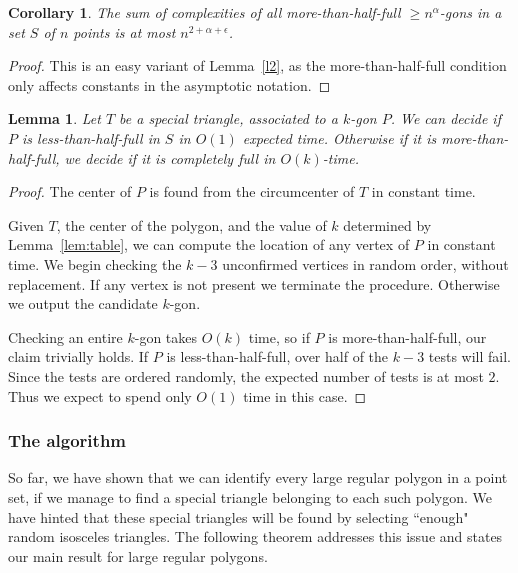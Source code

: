 \documentclass{article}
\newtheorem{lemma}{Lemma}
\newtheorem{cor}{Corollary}
\begin{document}
\begin{cor}
\label{c2}
The sum of complexities of all more-than-half-full ${\geq} n^{\alpha}$-gons
in a set $S$ of $n$ points is at most $n^{2{+}\alpha+\epsilon}$.
\end{cor}

\begin{proof}
This is an easy variant of Lemma~\ref{l2}, as the more-than-half-full
condition only affects constants in the asymptotic notation.
\end{proof}

\begin{lemma}
\label{l3}
Let $T$ be a special triangle, associated to a $k$-gon $P$.  We can decide if  $P$ is less-than-half-full in $S$ in $O(1)$ expected time.  Otherwise if it is more-than-half-full, we decide if it is completely full in $O(k)$-time.  
\end{lemma}
\begin{proof}
The center of $P$ is found from the circumcenter of $T$ in constant time.



Given $T$, the center of the polygon, and the value of $k$ determined by Lemma~\ref{lem:table},
we can compute 
the location of any vertex of $P$ in constant time.  We begin checking the $k{-}3$ unconfirmed vertices in random order, without replacement.  If any vertex
is not present we terminate the procedure. Otherwise we output the candidate $k$-gon.

Checking an entire $k$-gon takes $O(k)$ time, so if $P$ is more-than-half-full, our claim trivially
holds.  If $P$ is less-than-half-full,
over half of the $k{-}3$ tests will fail. Since the tests are ordered
randomly, the expected number of tests is at most $2$.  Thus we expect to
spend only $O(1)$ time in this case.
\end{proof}




\subsubsection{The algorithm}
\label{alltogether}
So far, we have shown that we can identify every large regular polygon in a point set, if
we manage to find a special triangle belonging to each such polygon.
We have hinted that these special triangles will be found by selecting ``enough" random isosceles triangles.
The following theorem addresses this issue and states our main result for large regular polygons.
\end{document}
